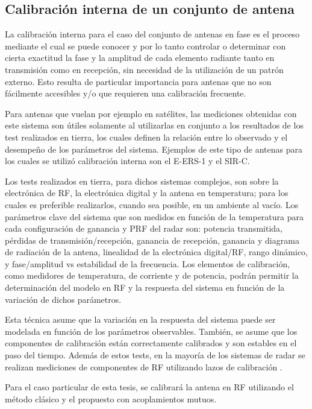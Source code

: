 \subsection{Calibración interna de un conjunto de antena}

La calibración interna para el caso del conjunto de antenas en fase es el proceso mediante el cual se puede conocer y por lo
tanto controlar o determinar con cierta exactitud la fase y la amplitud de cada elemento radiante tanto en transmisión como en
recepción, sin necesidad de la utilización de un patrón externo. Esto resulta de particular importancia para antenas que no
son fácilmente accesibles y/o que requieren una calibración frecuente.

Para antenas que vuelan por ejemplo en satélites, las mediciones obtenidas con este sistema son útiles solamente al utilizarlas
en conjunto a los resultados de los test realizados en tierra, los cuales definen la relación entre lo observado y el
desempeño de los parámetros del sistema. Ejemplos de este tipo de antenas para los cuales se utilizó calibración interna son
el E-ERS-1 y el SIR-C.

Los tests realizados en tierra, para dichos sistemas complejos, son sobre la electrónica de RF, la electrónica digital y la
antena en temperatura; para los cuales es preferible realizarlos, cuando sea posible, en un ambiente al vacío. Los
parámetros clave del sistema que son medidos en función de la temperatura para cada configuración de ganancia y PRF del radar
son: potencia transmitida, pérdidas de transmisión/recepción, ganancia de recepción, ganancia y diagrama de radiación de la 
antena, linealidad de la electrónica digital/RF, rango dinámico, y fase/amplitud vs estabilidad de la frecuencia. Los
elementos de calibración, como medidores de temperatura, de corriente y de potencia, podrán permitir la determinación del 
modelo en RF y la respuesta del sistema en función de la variación de dichos parámetros.

Esta técnica asume que la variación en la respuesta del sistema puede ser modelada en función de los parámetros observables.
También, se asume que los componentes de calibración están correctamente calibrados y son estables en el paso del tiempo.
Además de estos tests, en la mayoría de los sistemas de radar se realizan mediciones de componentes de RF utilizando lazos de
calibración \cite{Curlander1991}.

Para el caso particular de esta tesis, se calibrará la antena en RF utilizando el método clásico y el propuesto con 
acoplamientos mutuos.


